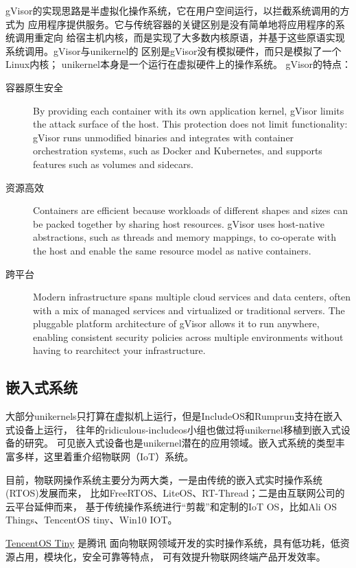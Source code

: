 \documentclass{../runikraft-report}
\begin{document}
gVisor的实现思路是半虚拟化操作系统，它在用户空间运行，以拦截系统调用的方式为
应用程序提供服务。它与传统容器的关键区别是没有简单地将应用程序的系统调用重定向
给宿主机内核，而是实现了大多数内核原语，并基于这些原语实现系统调用。gVisor与unikernel的
区别是gVisor没有模拟硬件，而只是模拟了一个Linux内核；
unikernel本身是一个运行在虚拟硬件上的操作系统。
gVisor的特点：\cite{bib:gvisor}
\begin{description}
\item[容器原生安全] By providing each container with its own application kernel, gVisor limits the attack surface of the host. This protection does not limit functionality: gVisor runs unmodified binaries and integrates with container orchestration systems, such as Docker and Kubernetes, and supports features such as volumes and sidecars.

\item[资源高效] Containers are efficient because workloads of different shapes and sizes can be packed together by sharing host resources. gVisor uses host-native abstractions, such as threads and memory mappings, to co-operate with the host and enable the same resource model as native containers.

\item[跨平台] Modern infrastructure spans multiple cloud services and data centers, often with a mix of managed services and virtualized or traditional servers. The pluggable platform architecture of gVisor allows it to run anywhere, enabling consistent security policies across multiple environments without having to rearchitect your infrastructure.
\end{description}

\subsection{嵌入式系统}
大部分unikernels只打算在虚拟机上运行，但是IncludeOS和Rumprun支持在嵌入式设备上运行，
往年的ridiculous-includeos小组也做过将unikernel移植到嵌入式设备的研究。
可见嵌入式设备也是unikernel潜在的应用领域。嵌入式系统的类型丰富多样，这里着重介绍物联网（IoT）系统。

目前，物联网操作系统主要分为两大类，一是由传统的嵌入式实时操作系统(RTOS)发展而来，
比如FreeRTOS、LiteOS、RT-Thread；二是由互联网公司的云平台延伸而来，
基于传统操作系统进行“剪裁”和定制的IoT OS，比如Ali OS Things、TencentOS tiny、Win10 IOT。\cite{bib:iot-sys}

\href{https://github.com/OpenAtomFoundation/TencentOS-tiny}{TencentOS Tiny} 是腾讯
面向物联网领域开发的实时操作系统，具有低功耗，低资源占用，模块化，安全可靠等特点，
可有效提升物联网终端产品开发效率。
\end{document}
